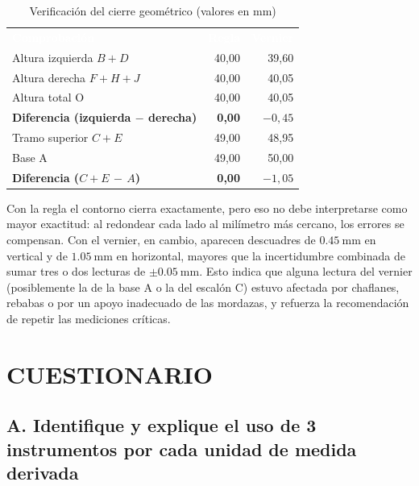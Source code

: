 \documentclass[12pt,a4paper]{article}
\newcommand{\encab}[1]{\textcolor{white}{\sffamily\bfseries #1}}
\begin{document}
\begin{table}[!htb]
	\centering
	\caption{Verificación del cierre geométrico (valores en mm)}\label{tab:cierre}
	\small
	\begin{tabular}{l r r}
		\rowcolor{darkblue}
		\encab{Comprobación}                        & \encab{Regla} &
		\encab{Vernier}                                                     \\
		Altura izquierda $B+D$                      & 40,00         & 39,60
		\\
		Altura derecha $F+H+J$                      & 40,00         & 40,05
		\\
		Altura total O                              & 40,00         & 40,05
		\\
		\textbf{Diferencia (izquierda $-$ derecha)} & \textbf{0,00} &
		\textbf{$-0{,}45$}                                                  \\
		Tramo superior $C+E$                        & 49,00         & 48,95
		\\
		Base A                                      & 49,00         & 50,00
		\\
		\textbf{Diferencia ($C+E$ $-$ $A$)}         & \textbf{0,00} &
		\textbf{$-1{,}05$}                                                  \\
	\end{tabular}
\end{table}

Con la regla el contorno cierra exactamente, pero eso no debe interpretarse como
mayor exactitud: al redondear cada lado al milímetro más cercano, los errores se
compensan. Con el vernier, en cambio, aparecen descuadres de
$\SI{0.45}{\milli\metre}$ en vertical y de $\SI{1.05}{\milli\metre}$ en
horizontal, mayores que la incertidumbre combinada de sumar tres o dos lecturas
de $\pm\SI{0.05}{\milli\metre}$. Esto indica que alguna lectura del vernier
(posiblemente la de la base A o la del escalón C) estuvo afectada por chaflanes,
rebabas o por un apoyo inadecuado de las mordazas, y refuerza la recomendación
de repetir las mediciones críticas.


\section{CUESTIONARIO}

\subsection*{A. Identifique y explique el uso de 3 instrumentos por cada unidad
	de medida derivada}
\end{document}
